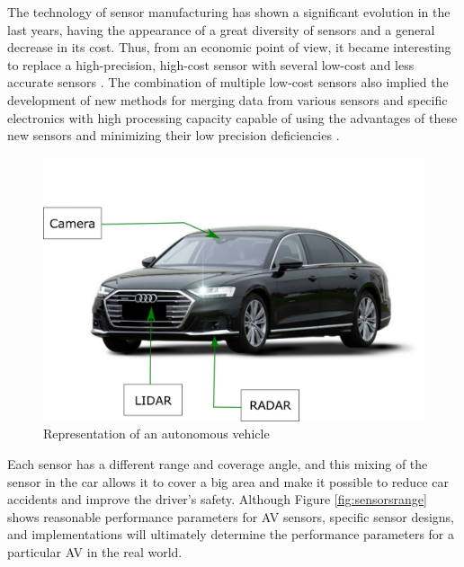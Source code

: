 The technology of sensor manufacturing has shown a significant evolution in the last years, having the appearance of a great diversity of sensors and a general decrease in its cost. Thus, from an economic point of view, it became interesting to replace a high-precision, high-cost sensor with several low-cost and less accurate sensors \cite{varghese2015overview}. The combination of multiple low-cost sensors also implied the development of new methods for merging data from various sensors and specific electronics with high processing capacity capable of using the advantages of these new sensors and minimizing their low precision deficiencies \cite{krasniqi2016use}.


\begin{figure}[H]
\centering
\includegraphics[scale=0.6]{imagens/image823.png}
\caption{Representation of an autonomous vehicle}
\label{fig:autonomous-vehicles}
\end{figure}


Each sensor has a different range and coverage angle, and this mixing of the sensor in the car allows it to cover a big area and make it possible to reduce car accidents and improve the driver's safety.  Although Figure \ref{fig:sensorsrange} shows reasonable performance parameters for AV sensors, specific sensor designs, and implementations will ultimately determine the performance parameters for a particular AV in the real world.


